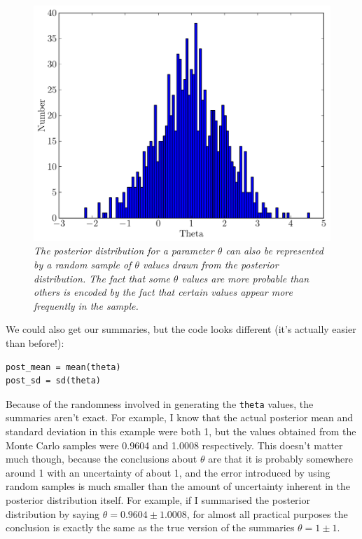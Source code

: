 \begin{figure}[ht!]
\begin{center}
\includegraphics[scale=0.5]{Figures/normal2.pdf}
\caption{\it The posterior distribution for a parameter $\theta$ can also be
represented by a random sample of $\theta$ values drawn from the posterior
distribution. The fact that some $\theta$ values are more probable than others
is encoded by the fact that certain values appear more frequently in the sample.
\label{fig:normal2}}
\end{center}
\end{figure}
We could also get our summaries, but the code looks different
(it's actually easier than before!):
\begin{verbatim}
post_mean = mean(theta)
post_sd = sd(theta)
\end{verbatim}
Because of the randomness involved in generating the {\tt theta} values,
the summaries aren't exact. For example, I know that the actual posterior mean
and standard deviation in this example were both 1, but the values obtained
from the Monte Carlo samples were 0.9604 and 1.0008 respectively. This doesn't
matter much though, because the conclusions about $\theta$ are that it is probably
somewhere around 1 with an uncertainty of about 1, and the error introduced by
using random samples is much smaller than the amount of uncertainty inherent
in the posterior distribution itself. For example, if I summarised the posterior
distribution by saying $\theta = 0.9604 \pm 1.0008$, for almost all practical
purposes the conclusion is exactly the same as the true version of the summaries
$\theta = 1 \pm 1$.

